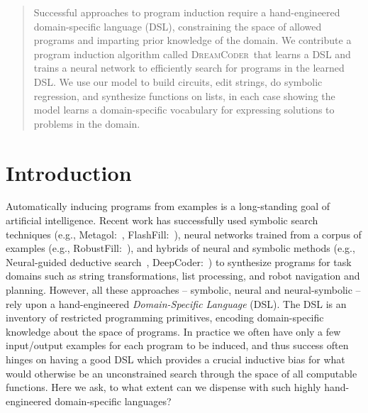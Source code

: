 \documentclass{article}
\newcommand{\system}{\textsc{DreamCoder}~}
\begin{document}
\printAffiliationsAndNotice{\icmlEqualContribution} %

\begin{abstract}
  Successful approaches to program induction require a hand-engineered
  domain-specific language (DSL), constraining the space of allowed
  programs and imparting prior knowledge of the domain.  We contribute
  a program induction algorithm called \system that learns a DSL and
  trains a neural network to efficiently search for programs in the
  learned DSL.  We use our model to build circuits, edit strings, do
  symbolic regression, and synthesize functions on lists, in each case
  showing the model learns a domain-specific vocabulary for expressing
  solutions to problems in the domain.
  
  
  
  
  

\end{abstract}

\section{Introduction}

Automatically inducing programs from examples is a long-standing goal
of artificial intelligence. Recent work has successfully used
symbolic search techniques (e.g., Metagol:~\cite{muggleton2015meta},
FlashFill:~\cite{gulwani2011automating}), neural networks trained from
a corpus of examples (e.g., RobustFill:~\cite{devlin2017robustfill}), and hybrids of neural and
symbolic methods (e.g., Neural-guided deductive search~\cite{ngds}, DeepCoder:~\cite{balog2016deepcoder}) to
synthesize programs for task domains such as string transformations,
list processing, and robot navigation and planning. However, all these
approaches -- symbolic, neural and neural-symbolic -- rely upon a
hand-engineered \emph{Domain-Specific Language} (DSL). The DSL is an
inventory of restricted programming primitives, encoding domain-specific
knowledge about the space of programs. In
practice
we often have only a few input/output examples for each
program to be induced, and thus success often hinges on having a good
DSL which
provides a crucial inductive bias for what would otherwise be an
unconstrained search through the space of all computable functions.
Here we ask, to what extent can we dispense with such highly
hand-engineered domain-specific languages?
\end{document}

